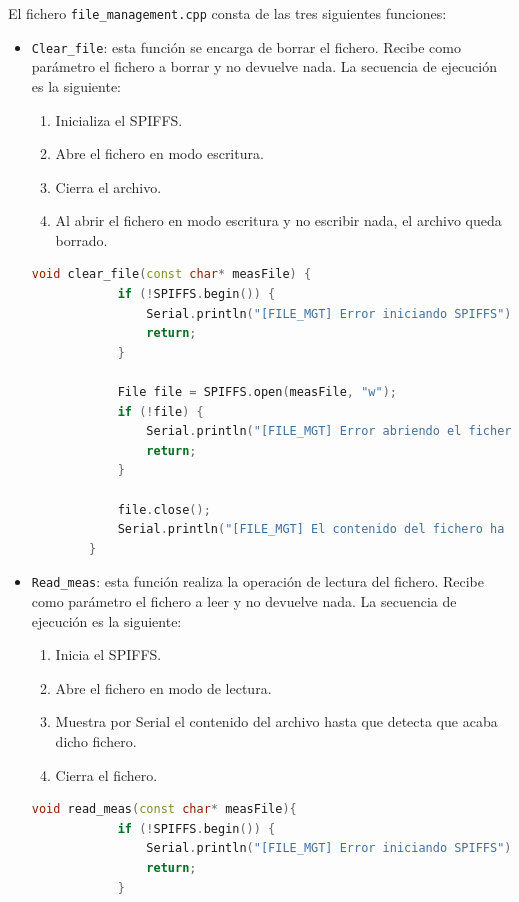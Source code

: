 El fichero \texttt{file\_management.cpp} consta de las tres siguientes funciones:
\begin{itemize}
    \item \texttt{Clear\_file}: esta función se encarga de borrar el fichero. Recibe como parámetro el fichero a borrar y no devuelve nada. La secuencia de ejecución es la siguiente:
    \begin{enumerate}
        \item Inicializa el SPIFFS.
        \item Abre el fichero en modo escritura.
        \item Cierra el archivo.
        \item Al abrir el fichero en modo escritura y no escribir nada, el archivo queda borrado.
    \end{enumerate}
    \begin{lstlisting}[captionpos=b, caption={Funcion \texttt{Clear\_file}}, language=c++]
        void clear_file(const char* measFile) {
            if (!SPIFFS.begin()) {
                Serial.println("[FILE_MGT] Error iniciando SPIFFS");
                return;
            }

            File file = SPIFFS.open(measFile, "w");
            if (!file) {
                Serial.println("[FILE_MGT] Error abriendo el fichero para borrar");
                return;
            }

            file.close();
            Serial.println("[FILE_MGT] El contenido del fichero ha sido borrado.");
        }
    \end{lstlisting}
    \item \texttt{Read\_meas}: esta función realiza la operación de lectura del fichero. Recibe como parámetro el fichero a leer y no devuelve nada. La secuencia de ejecución es la siguiente:
    \begin{enumerate}
        \item Inicia el SPIFFS.
        \item Abre el fichero en modo de lectura.
        \item Muestra por Serial el contenido del archivo hasta que detecta que acaba dicho fichero.
        \item Cierra el fichero.
    \end{enumerate}
    \begin{lstlisting}[captionpos=b, caption={Funcion \texttt{Read\_file}}, language=c++]
        void read_meas(const char* measFile){
            if (!SPIFFS.begin()) {
                Serial.println("[FILE_MGT] Error iniciando SPIFFS");
                return;
            }


\end{lstlisting}
\end{itemize}
